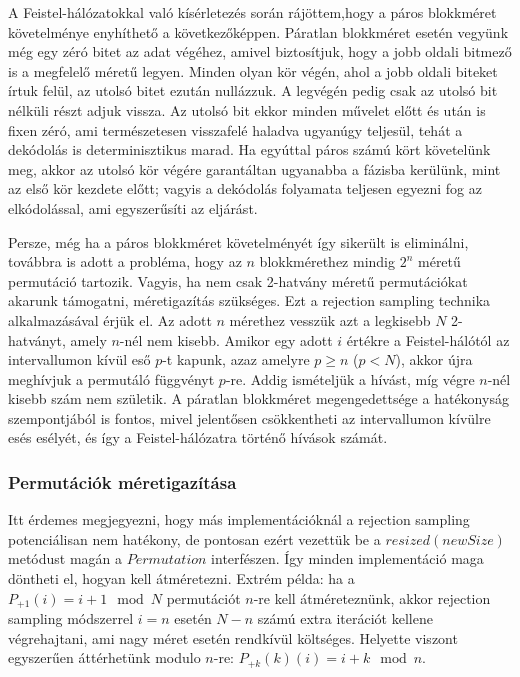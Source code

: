 \documentclass[
    parspace,
    noindent,
    nohyp,
]{elteiktdk}[2023/04/10]
\begin{document}
A Feistel-hálózatokkal való kísérletezés során rájöttem,hogy a páros blokkméret követelménye enyhíthető a következőképpen.
Páratlan blokkméret esetén vegyünk még egy zéró bitet az adat végéhez,
amivel biztosítjuk, hogy a jobb oldali bitmező is a megfelelő méretű legyen.
Minden olyan kör végén, ahol a jobb oldali biteket írtuk felül, az utolsó bitet ezután nullázzuk.
A legvégén pedig csak az utolsó bit nélküli részt adjuk vissza.
Az utolsó bit ekkor minden művelet előtt és után is fixen zéró,
ami természetesen visszafelé haladva ugyanúgy teljesül, tehát a dekódolás is determinisztikus marad.
Ha egyúttal páros számú kört követelünk meg,
akkor az utolsó kör végére garantáltan ugyanabba a fázisba kerülünk, mint az első kör kezdete előtt;
vagyis a dekódolás folyamata teljesen egyezni fog az elkódolással, ami egyszerűsíti az eljárást.




Persze, még ha a páros blokkméret követelményét így sikerült is eliminálni,
továbbra is adott a probléma, hogy az $n$ blokkmérethez mindig $2^n$ méretű permutáció tartozik.
Vagyis, ha nem csak 2-hatvány méretű permutációkat akarunk támogatni, méretigazítás szükséges.
Ezt a rejection sampling technika alkalmazásával érjük el.
Az adott $n$ mérethez vesszük azt a legkisebb $N$ 2-hatványt, amely $n$-nél nem kisebb.
Amikor egy adott $i$ értékre a Feistel-hálótól az intervallumon kívül eső $p$-t kapunk,
azaz amelyre $p \geq n$ ($p < N$), akkor újra meghívjuk a permutáló függvényt $p$-re.
Addig ismételjük a hívást, míg végre $n$-nél kisebb szám nem születik.
A páratlan blokkméret megengedettsége a hatékonyság szempontjából is fontos,
mivel jelentősen csökkentheti az intervallumon kívülre esés esélyét,
és így a Feistel-hálózatra történő hívások számát.

\subsubsection{Permutációk méretigazítása}

Itt érdemes megjegyezni, hogy más implementációknál a rejection sampling potenciálisan nem hatékony,
de pontosan ezért vezettük be a $resized(newSize)$ metódust magán a $Permutation$ interfészen.
Így minden implementáció maga döntheti el, hogyan kell átméretezni.
Extrém példa: ha a $P_{+1}(i) = i + 1 \mod N$ permutációt $n$-re kell átméreteznünk,
akkor rejection sampling módszerrel $i = n$ esetén $N - n$ számú extra iterációt kellene végrehajtani,
ami nagy méret esetén rendkívül költséges.
Helyette viszont egyszerűen áttérhetünk modulo $n$-re: $P_{+k}(k)(i) = i + k \mod n$.
\end{document}

